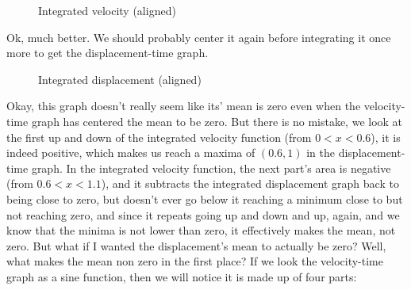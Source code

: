 \documentclass[12pt]{article}
\begin{document}
\begin{figure}[H]
    \caption{Integrated velocity (aligned)}
    \label{fig:vel (aligned)}
\end{figure}

Ok, much better. We should probably center it again before integrating it once more to get the displacement-time graph.

\begin{figure}[H]
    \caption{Integrated displacement (aligned)}
    \label{fig:displ (aligned)}
\end{figure}

Okay, this graph doesn't really seem like its' mean is zero even when the velocity-time graph has centered the mean to be zero. But there is no mistake, we look at the first up and down of the integrated velocity function (from $0<x<0.6$), it is indeed positive, which makes us reach a maxima of $\left(0.6, 1\right)$ in the displacement-time graph. In the integrated velocity function, the next part's area is negative (from $0.6<x<1.1$), and it subtracts the integrated displacement graph back to being close to zero, but doesn't ever go below it reaching a minimum close to but not reaching zero, and since it repeats going up and down and up, again, and we know that the minima is not lower than zero, it effectively makes the mean, not zero.
But what if I wanted the displacement's mean to actually be zero? Well, what makes the mean non zero in the first place? If we look the velocity-time graph as a sine function, then we will notice it is made up of four parts:
\end{document}
